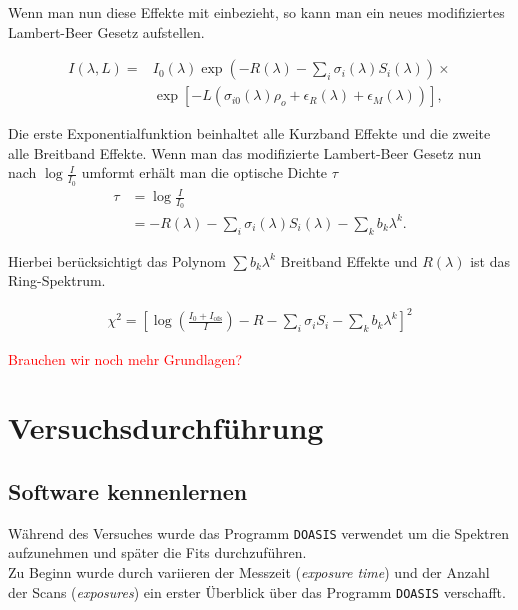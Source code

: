 \documentclass[12pt, a4paper, bibliography=totoc]{scrartcl}
\begin{document}
\begin{multicols}{2}
Wenn man nun diese Effekte mit einbezieht, so kann man ein neues modifiziertes Lambert-Beer Gesetz aufstellen.

\begin{align*}
    I(\lambda, L) = & I_0 (\lambda) \exp \left( -R ( \lambda ) - \sum_i \sigma_i (\lambda)
    S_i (\lambda) \right) \times \\
    & \exp \left[ - L \left( \sigma_{i0} (\lambda) \rho_o + \epsilon_R (\lambda) + \epsilon_M (\lambda) \right) \right], \label{eq:mod_lambert_beer_law}
\end{align*}

Die erste Exponentialfunktion beinhaltet alle Kurzband Effekte und die zweite alle Breitband Effekte.
Wenn man das modifizierte Lambert-Beer Gesetz nun nach $\log \frac{I}{I_0}$ umformt erhält man die optische Dichte $\tau$
\begin{align}
\tau &= \log \frac{I}{I_0} \\
    &= - R(\lambda) - \sum_i \sigma_i (\lambda) S_i (\lambda) - \sum_k b_k \lambda^k.\label{eq:optical_density}
\end{align}

Hierbei berücksichtigt das Polynom $\sum b_k \lambda^k$ Breitband Effekte und $R(\lambda)$ ist das Ring-Spektrum.

\begin{align*}
    \chi^2 = \left[ \log \left( \frac{I_0 + I_\text{ofs}}{I}\right) - R - \sum_i \sigma_i S_i - \sum_k b_k \lambda^k \right]^2
\end{align*}


\textcolor{red}{Brauchen wir noch mehr Grundlagen?}

\section{Versuchsdurchführung}\label{sec:versuchsdurchführung}

\subsection{Software kennenlernen}\label{get_to_know_the_software}

Während des Versuches wurde das Programm \verb*+DOASIS+ verwendet um die Spektren aufzunehmen und später die Fits durchzuführen.\\
Zu Beginn wurde durch variieren der Messzeit (\textit{exposure time}) und der Anzahl der Scans (\textit{exposures}) ein erster Überblick über das Programm \verb*+DOASIS+ verschafft.


\end{multicols}
\end{document}
